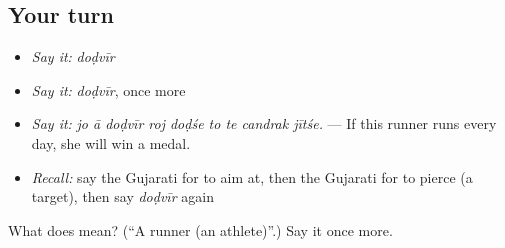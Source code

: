 \subsection*{Your turn}
\begin{itemize}
\raggedright
  \item \emph{Say it:} \emph{doḍvīr}
  \item \emph{Say it:} \emph{doḍvīr}, once more
  \item \emph{Say it:} \emph{jo ā doḍvīr roj doḍśe to te candrak jītśe.} — If this runner runs every day, she will win a medal.
  \item \emph{Recall:} say the Gujarati for to aim at, then the Gujarati for to pierce (a target), then say \emph{doḍvīr} again
\end{itemize}

\begin{tcolorbox}[breakable,colback=teal!4,colframe=teal!35!black,title={Before you move on}]
What does  mean? (\textquotedblleft{}A runner (an athlete)\textquotedblright{}.) Say it once more.
\end{tcolorbox}
